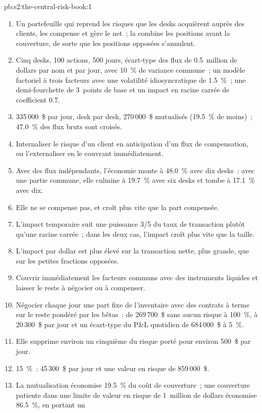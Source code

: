 \begin{solution}{pb:s2:the-central-risk-book:1}
\begin{enumerate}
\item Un portefeuille qui reprend les risques que les desks acquièrent auprès des clients, les compense et gère le net~; la  combine les positions avant la couverture, de sorte que les positions opposées s'annulent.
\item Cinq desks, 100 actions, 500 jours, écart-type des flux de 0.5~million de dollars par nom et par jour, avec 10~\% de variance commune~; un modèle factoriel à trois facteurs avec une
volatilité idiosyncratique de 1.5~\%~; une demi-fourchette de 3~points de base et un impact en racine carrée de coefficient 0.7.
\item 335\,000~\$ par jour, desk par desk, 270\,000~\$ mutualisés (19.5~\% de moins)~; 47.0~\% des flux bruts sont croisés.
\item Internaliser le risque d'un client en anticipation d'un flux de compensation, ou l'externaliser en le couvrant immédiatement.
\item Avec des flux indépendants, l'économie monte à 48.0~\% avec dix desks~; avec une partie commune, elle culmine à 19.7~\% avec six desks et tombe à 17.1~\% avec dix.
\item Elle ne se compense pas, et croît plus vite que la part compensée.
\item L'impact temporaire suit une puissance 3/5 du taux de transaction plutôt qu'une racine carrée~; dans les deux cas, l'impact croît plus vite que la taille.
\item L'impact par dollar est plus élevé sur la transaction nette, plus grande, que sur les petites fractions opposées.
\item Couvrir immédiatement les facteurs communs avec des instruments liquides et laisser le reste à négocier ou à compenser.
\item Négocier chaque jour une part fixe de l'inventaire avec des contrats à terme sur le reste pondéré par les bêtas~: de 269\,700~\$ sans aucun risque à 100~\%, à 20\,300~\$ par jour et
un écart-type du P\&L quotidien de 684\,000~\$ à 5~\%.
\item Elle supprime environ un cinquième du risque porté pour environ 500~\$ par jour.
\item 15~\%~: 45\,300~\$ par jour et une valeur en risque de 859\,000~\$.
\item La mutualisation économise 19.5~\% du coût de couverture~; une couverture patiente dans une limite de valeur en risque de 1~million de dollars économise 86.5~\%, en portant un

\end{enumerate}
\end{solution}
